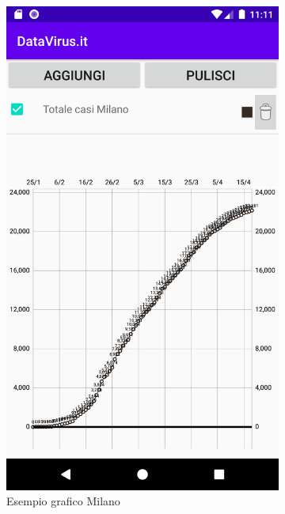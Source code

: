 \documentclass{article}
\begin{document}
    \begin{figure}[h]
      \centering
      \begin{subfigure}{.5\textwidth}
        \centering
        \includegraphics[width=.7\linewidth]{milano.png}
        \caption{Esempio grafico Milano}
        \label{fig5:sub1}
      \end{subfigure}%
      \begin{subfigure}{.5\textwidth}
        \centering

\end{subfigure}
\end{figure}
\end{document}
